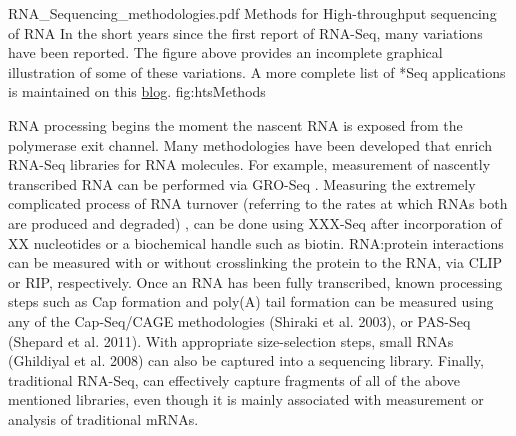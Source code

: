 \InsertFigure
	{RNA_Sequencing_methodologies.pdf}
	{Methods for High-throughput sequencing of RNA}
	{In the short years since the first report of RNA-Seq, many variations have been reported. The figure 
	above provides an incomplete graphical illustration of some of these variations. A more complete list 
	of *Seq applications is maintained on this \href{http://liorpachter.wordpress.com/seq/}{blog}.}
	{fig:htsMethods}

RNA processing begins the moment the nascent RNA is exposed from the polymerase exit channel. Many methodologies have been developed that enrich RNA-Seq libraries for RNA molecules. For example, measurement of nascently transcribed RNA can be performed via GRO-Seq \citep{Core2008a}. Measuring the extremely complicated process of RNA turnover (referring to the rates at which RNAs both are produced and degraded) \citep{Ghosh2010a}, can be done using XXX-Seq after incorporation of XX nucleotides or a biochemical handle such as biotin. RNA:protein interactions can be measured with or without crosslinking the protein to the RNA, via CLIP or RIP, respectively. Once an RNA has been fully transcribed, known processing steps such as Cap formation and poly(A) tail formation can be measured using any of the Cap-Seq/CAGE methodologies (Shiraki et al. 2003), or PAS-Seq (Shepard et al. 2011). With appropriate size-selection steps, small RNAs (Ghildiyal et al. 2008) can also be captured into a sequencing library. Finally, traditional RNA-Seq, can effectively capture fragments of all of the above mentioned libraries, even though it is mainly associated with measurement or analysis of traditional mRNAs.


 